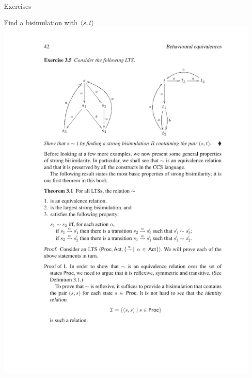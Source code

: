 \documentclass[aspectratio=169]{beamer}
\begin{document}
\begin{slide}{Exercises}
\begin{exampleblock}{\exercise Find a bisimulation with $\mathopen{\langle}s,t\mathclose{\rangle}$}
{  \includegraphics{images/LTS-2}
}
\end{exampleblock}
\end{slide}
\end{document}
